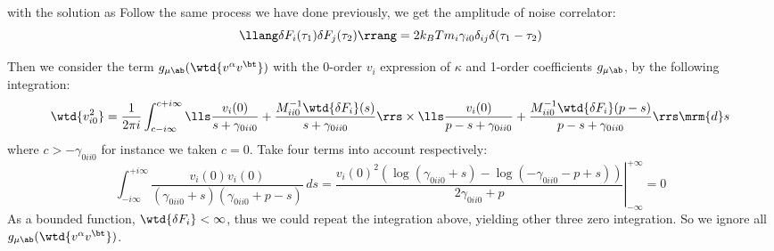with the solution as
Follow the same process we have done previously, we get the amplitude of noise correlator:
$$ \llang \delta F_i (\tau_1) \delta F_j(\tau_2) \rrang = 2 k_B T m_i \gamma_{i0} \delta_{ij} \delta(\tau_1 - \tau_2) $$


Then we consider the term $g_{\mu\ab} (\wtd{v^\alpha v^\bt})$ with the 0-order $v_i$ expression of $\kappa$ and 1-order coefficients $g_{\mu\ab}$, by the following integration:
$$ \wtd{v_{i0}^2} = \frac{1}{2\pi i} \int_{c-i\infty}^{c+i\infty} \lls \frac{v_i(0)}{s+\gamma_{0ii0}} + \frac{M^{-1}_{ii0} \wtd{\delta F_i}(s)}{s+\gamma_{0ii0}} \rrs \times \lls \frac{v_i(0)}{p-s+\gamma_{0ii0}} + \frac{M^{-1}_{ii0} \wtd{\delta F_i}(p-s) }{p-s+\gamma_{0ii0}} \rrs \mrm{d}s $$
where $c>-\gamma_{0ii0}$ for instance we taken $c=0$. Take four terms into account respectively:
$$ \int_{-i\infty}^{+i\infty} \frac{v_i(0) v_i(0)}{(\gamma_{0ii0}+s) (\gamma_{0ii0}+p-s)} \, ds = \left. \frac{v_i(0)^2 (\log (\gamma_{0ii0}+s)-\log (-\gamma_{0ii0}-p+s))}{2 \gamma_{0ii0}+p} \right\vert_{-\infty}^{+\infty} = 0 $$
As a bounded function, $\wtd{\delta F_i} < \infty$, thus we could repeat the integration above, yielding other three zero integration. So we ignore all $g_{\mu\ab} (\wtd{v^\alpha v^\bt})$. %



